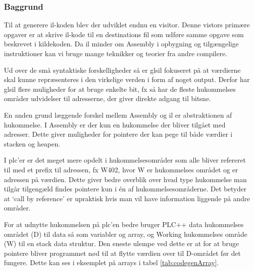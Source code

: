 \subsubsection{Baggrund}
Til at generere \gls{il}-koden blev der udviklet endnu en visitor. Denne vistors primære opgaver er at skrive \gls{il}-kode til en destinations fil som udføre samme opgave som beskrevet i kildekoden. Da \gls{il} minder om Assembly i opbygning og tilgængelige instruktioner kan vi bruge mange teknikker og teorier fra andre compilere.

Ud over de små syntaktiske forskelligheder så er gls{il} fokuseret på at værdierne skal kunne repræsenteres i den virkelige verden i form af noget output. Derfor har gls{il} flere muligheder for at bruge enkelte bit, fx så har de fleste hukommelses områder udvidelser til adresserne, der giver direkte adgang til bitsne. 

En anden grund læggende forskel mellem Assembly og \gls{il} er abstraktionen af hukommelse. I Assembly er der kun en hukommelse der bliver tilgået med adresser. Dette giver muligheder for pointere der kan pege til både værdier i stacken og heapen.

I \gls{plc}'er er det meget mere opdelt i hukommelsesområder som alle bliver refereret til med et prefix til adressen, fx {\ttfamily W402}, hvor {\ttfamily W} er hukommelses området og {} er adressen på værdien. Dette giver bedre overblik over hvad type hukommelse man tilgår tilgengæld findes pointere kun i én af hukommelsesområderne. Det betyder at \enquote*{call by reference} er upraktisk hvis man vil have information liggende på andre områder.

For at udnytte hukommelsen på \gls{plc}'en bedre bruger PLC++ data hukommelses området ({\ttfamily D}) til data så som variabler og array, og Working hukommelses område ({\ttfamily W}) til en stack data struktur. Den eneste ulempe ved dette er at for at bruge pointere bliver programmet nød til at flytte værdien over til {\ttfamily D}-området før det fungere. Dette kan ses i eksemplet på arrays i tabel \ref{tab:codegenArray}.